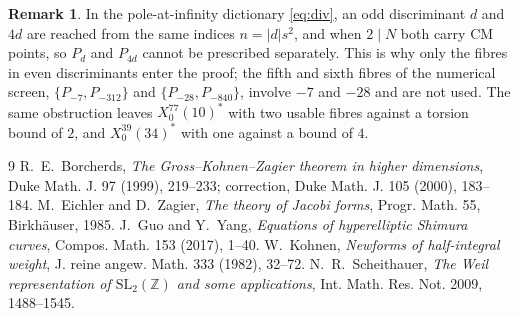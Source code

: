 \documentclass[11pt,reqno]{amsart}
\theoremstyle{plain}
\theoremstyle{definition}
\newtheorem{remark}[theorem]{Remark}
\newcommand{\Z}{\mathbb{Z}}
\begin{document}
\begin{remark}
In the pole-at-infinity dictionary \eqref{eq:div}, an odd discriminant $d$ and $4d$ are reached from
the same indices $n=|d|s^2$, and when $2\mid N$ both carry CM points, so $P_d$ and $P_{4d}$ cannot be
prescribed separately. This is why only the fibres in even discriminants enter the proof; the fifth
and sixth fibres of the numerical screen, $\{P_{-7},P_{-312}\}$ and $\{P_{-28},P_{-840}\}$, involve
$-7$ and $-28$ and are not used. The same obstruction leaves $X_0^{77}(10)^*$ with two usable fibres
against a torsion bound of $2$, and $X_0^{39}(34)^*$ with one against a bound of $4$.
\end{remark}

\begin{thebibliography}{9}
 R.~E.~Borcherds, \emph{The Gross--Kohnen--Zagier theorem in higher dimensions},
Duke Math. J. 97 (1999), 219–233; correction, Duke Math. J. 105 (2000), 183–184.
 M.~Eichler and D.~Zagier, \emph{The theory of Jacobi forms}, Progr. Math. 55,
Birkh\"auser, 1985.
 J.~Guo and Y.~Yang, \emph{Equations of hyperelliptic Shimura curves}, Compos. Math.
153 (2017), 1–40.
 W.~Kohnen, \emph{Newforms of half-integral weight}, J. reine angew. Math. 333
(1982), 32–72.
 N.~R.~Scheithauer, \emph{The Weil representation of $\mathrm{SL}_2(\Z)$ and
some applications}, Int. Math. Res. Not. 2009, 1488–1545.
\end{thebibliography}
\end{document}
